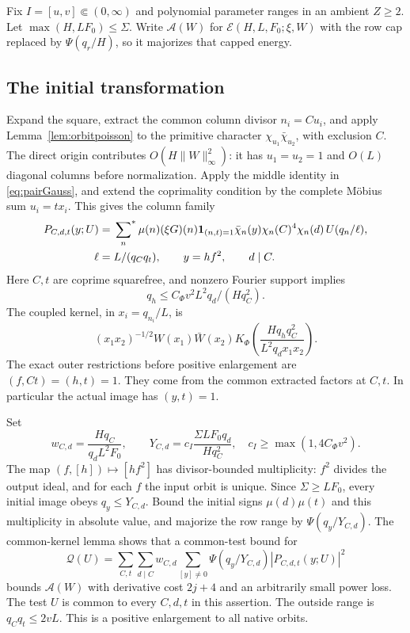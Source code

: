 \documentclass[11pt,a4paper]{article}
\numberwithin{equation}{section}
\theoremstyle{definition}
\theoremstyle{remark}
\newcommand{\ind}{\mathbf1}
\newcommand{\sfstar}{\sideset{}{^*}\sum}
\newcommand{\E}{\mathcal E}
\begin{document}
Fix $I=[u,v]\Subset(0,\infty)$ and polynomial parameter ranges in an ambient $Z\ge2$. Let $\max(H,LF_0)\le\Sigma$. Write $\mathcal A(W)$ for $\E(H,L,F_0;\xi,W)$ with the row cap replaced by $\Psi(q_r/H)$, so it majorizes that capped energy.

\subsection{The initial transformation}
Expand the square, extract the common column divisor $n_i=Cu_i$, and apply Lemma~\ref{lem:orbitpoisson} to the primitive character $\chi_{u_1}\bar\chi_{u_2}$, with exclusion $C$. The direct origin contributes $O(H\|W\|_\infty^2)$: it has $u_1=u_2=1$ and $O(L)$ diagonal columns before normalization. Apply the middle identity in \eqref{eq:pairGauss}, and extend the coprimality condition by the complete M\"obius sum $u_i=tx_i$. This gives the column family
\begin{align}\label{eq:initialP}
 P_{C,d,t}(y;U)&=\sfstar_n\mu(n)(\xi G)(n)\ind_{(n,t)=1}
 \bar\chi_n(y)\chi_n(C)^4\chi_n(d)\,U(q_n/\ell),\\
 \ell&=L/(q_Cq_t),\qquad y=hf^2,\qquad d\mid C.\notag
\end{align}
Here $C,t$ are coprime squarefree, and nonzero Fourier support implies
\[
 q_h\le C_\Phi v^2L^2q_d/(Hq_C^2).
\]
The coupled kernel, in $x_i=q_{n_i}/L$, is
\[
 (x_1x_2)^{-1/2}W(x_1)\bar W(x_2)
 K_\Phi\left(\frac{Hq_hq_C^2}{L^2q_dx_1x_2}\right).
\]
The exact outer restrictions before positive enlargement are
$(f,Ct)=(h,t)=1$. They come from the common extracted factors at $C,t$. In particular the actual image has $(y,t)=1$.

Set
\begin{equation}\label{eq:weightsY}
 w_{C,d}=\frac{Hq_C}{q_dL^2F_0},\qquad
 Y_{C,d}=c_I\frac{\Sigma LF_0q_d}{Hq_C^2},
 \quad c_I\ge\max(1,4C_\Phi v^2).
\end{equation}
The map $(f,[h])\mapsto[hf^2]$ has divisor-bounded multiplicity: $f^2$ divides the output ideal, and for each $f$ the input orbit is unique. Since $\Sigma\ge LF_0$, every initial image obeys $q_y\le Y_{C,d}$. Bound the initial signs $\mu(d)\mu(t)$ and this multiplicity in absolute value, and majorize the row range by $\Psi(q_y/Y_{C,d})$. The common-kernel lemma shows that a common-test bound for
\begin{equation}\label{eq:Qform}
 \mathcal Q(U)=\sum_{C,t}\sum_{d\mid C}w_{C,d}
       \sum_{[y]\ne0}\Psi(q_y/Y_{C,d})|P_{C,d,t}(y;U)|^2
\end{equation}
bounds $\mathcal A(W)$ with derivative cost $2j+4$ and an arbitrarily small power loss. The test $U$ is common to every $C,d,t$ in this assertion. The outside range is $q_Cq_t\le2vL$. This is a positive enlargement to all native orbits.
\end{document}
